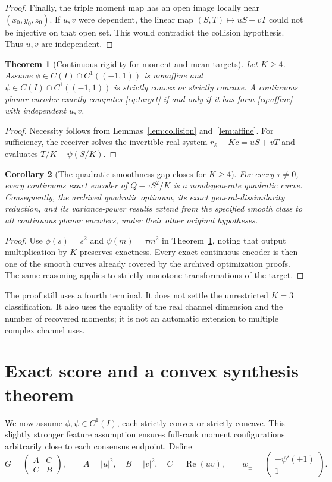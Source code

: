 \documentclass[11pt,letterpaper]{article}
\newtheorem{theorem}{Theorem}
\newtheorem{corollary}[theorem]{Corollary}
\theoremstyle{remark}
\newcommand{\enc}{\mathscr E}
\begin{document}
\begin{proof}
Finally, the triple moment map has an open image locally near $(x_0,y_0,z_0)$. If $u,v$ were dependent, the linear map $(S,T)\mapsto uS+vT$ could not be injective on that open set. This would contradict the collision hypothesis. Thus $u,v$ are independent.
\end{proof}

\begin{theorem}[Continuous rigidity for moment-and-mean targets]
\label{thm:rigidity}
Let $K\ge4$. Assume $\phi\in C(I)\cap C^1((-1,1))$ is nonaffine and $\psi\in C(I)\cap C^1((-1,1))$ is strictly convex or strictly concave. A continuous planar encoder exactly computes \eqref{eq:target} if and only if it has form \eqref{eq:affine} with independent $u,v$.
\end{theorem}
\begin{proof}
Necessity follows from Lemmas~\ref{lem:collision} and~\ref{lem:affine}. For sufficiency, the receiver solves the invertible real system $r_\enc-Kc=uS+vT$ and evaluates $T/K-\psi(S/K)$.
\end{proof}

\begin{corollary}[The quadratic smoothness gap closes for $K\ge4$]
For every $\tau\ne0$, every continuous exact encoder of $Q-\tau S^2/K$ is a nondegenerate quadratic curve. Consequently, the archived quadratic optimum, its exact general-dissimilarity reduction, and its variance-power results extend from the specified smooth class to all continuous planar encoders, under their other original hypotheses.
\end{corollary}
\begin{proof}
Use $\phi(s)=s^2$ and $\psi(m)=\tau m^2$ in Theorem~\ref{thm:rigidity}, noting that output multiplication by $K$ preserves exactness. Every exact continuous encoder is then one of the smooth curves already covered by the archived optimization proofs. The same reasoning applies to strictly monotone transformations of the target.
\end{proof}

The proof still uses a fourth terminal. It does not settle the unrestricted $K=3$ classification. It also uses the equality of the real channel dimension and the number of recovered moments; it is not an automatic extension to multiple complex channel uses.

\section{Exact score and a convex synthesis theorem}
We now assume $\phi,\psi\in C^1(I)$, each strictly convex or strictly concave. This slightly stronger feature assumption ensures full-rank moment configurations arbitrarily close to each consensus endpoint. Define
$$
 G=\begin{pmatrix}A&C\\ C&B\end{pmatrix},\qquad
 A=|u|^2,\quad B=|v|^2,\quad C=\operatorname{Re}(u\overline v),
 \qquad w_\pm=\begin{pmatrix}-\psi'(\pm1)\\1\end{pmatrix}.
$$
\end{document}
